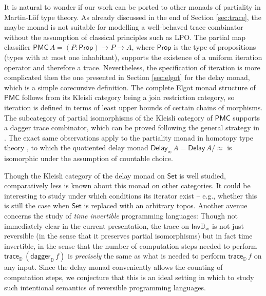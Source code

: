 \documentclass[runningheads,a4paper]{llncs}
\newcommand{\Set}{\mathsf{Set}}
\newcommand{\Inv}{\mathsf{Inv}}
\newcommand{\Delay}{\ensuremath{\mathsf{Delay}\,}}
\newcommand{\D}{\mathbb{D}}
\newcommand{\Dapprox}{\mathbb{D}_{\approx}}
\newcommand{\traceD}{\mathsf{trace}_\D}
\newcommand{\daggerD}{\mathsf{dagger}_\D}
\begin{document}
It is natural to wonder if our work can be ported to other monads of partiality
in Martin-L\"of type theory. As already discussed in the end of Section
\ref{sec:trace}, the maybe monad is not suitable for modelling a
well-behaved trace combinator without the assumption of classical principles
such as \textsf{LPO}. The partial map classifier \cite{UustaluV17-2,EscardoK17}
$\mathsf{PMC}\,A = (P : \mathsf{Prop}) \to P \to A$, where $\mathsf{Prop}$ is
the type of propositions (types with at most one inhabitant), supports the
existence of a uniform iteration operator and therefore a trace. Nevertheless,
the specification of iteration is more complicated then the one presented in
Section \ref{sec:elgot} for the delay monad, which is a simple corecursive
definition. The complete Elgot monad structure of $\mathsf{PMC}$ follows from its
Kleisli category being a join restriction category, so iteration is defined in
terms of least upper bounds of certain chains of morphisms. The subcategory of
partial isomorphisms of the Kleisli category of $\mathsf{PMC}$ supports a
dagger trace combinator, which can be proved following the general strategy in
\cite{KaarsgaardAG17}. The exact same observations apply to the partiality
monad in homotopy type theory \cite{AltenkirchDK17,ChapmanUV19}, to which the
quotiented delay monad $\mathsf{Delay}_{\approx}\,A = \Delay A/{\approx}$ is
isomorphic under the assumption of countable choice.

Though the Kleisli category of the delay monad on $\Set$ is well studied,
comparatively less is known about this monad on other categories. It could be
interesting to study under which conditions its iterator exist -- e.g., whether
this is still the case when $\Set$ is replaced with an arbitrary topos. Another
avenue concerns the study of \emph{time invertible} programming languages:
Though not immediately clear in the current presentation, the trace on
$\Inv\Dapprox$ is not just reversible (in the sense that it preserves partial
isomorphisms) but in fact time invertible, in the sense that the number of
computation steps needed to perform $\traceD \,(\daggerD\, f)$ is \emph{precisely}
the same as what is needed to perform $\traceD\,f$ on any input. Since the
delay monad conveniently allows the counting of computation steps, we
conjecture that this is an ideal setting in which to study such intentional
semantics of reversible programming languages.

%
%
%
%
%
%


\end{document}
